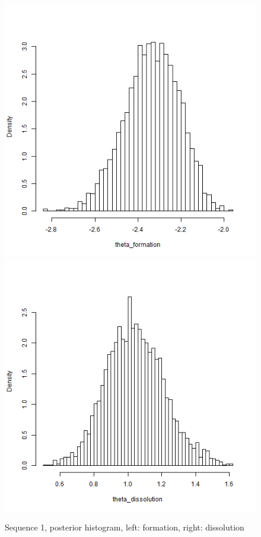 \documentclass[a4paper, 11pt]{report}
\theoremstyle{definition}
\begin{document}
\begin{figure}[h]
    \begin{center}
        \includegraphics[scale=0.395]{pictures/net1seq_chain1_BSTERGM_formation_histogram.png}
        \includegraphics[scale=0.395]{pictures/net1seq_chain1_BSTERGM_dissolution_histogram.png}
    \caption{Sequence 1, posterior histogram, left: formation, right: dissolution}
    \end{center}
\end{figure}
\end{document}
